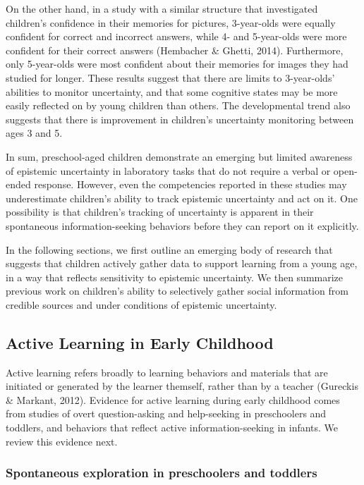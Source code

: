 \documentclass[a4paper,man,apacite,floatsintext]{apa6}
\begin{document}
On the other hand, in a study with a similar structure that investigated
children's confidence in their memories for pictures, 3-year-olds were
equally confident for correct and incorrect answers, while 4- and
5-year-olds were more confident for their correct answers (Hembacher \&
Ghetti, 2014). Furthermore, only 5-year-olds were most confident about
their memories for images they had studied for longer. These results
suggest that there are limits to 3-year-olds' abilities to monitor
uncertainty, and that some cognitive states may be more easily reflected
on by young children than others. The developmental trend also suggests
that there is improvement in children's uncertainty monitoring between
ages 3 and 5.

In sum, preschool-aged children demonstrate an emerging but limited
awareness of epistemic uncertainty in laboratory tasks that do not
require a verbal or open-ended response. However, even the competencies
reported in these studies may underestimate children's ability to track
epistemic uncertainty and act on it. One possibility is that children's
tracking of uncertainty is apparent in their spontaneous
information-seeking behaviors before they can report on it explicitly.

In the following sections, we first outline an emerging body of research
that suggests that children actively gather data to support learning
from a young age, in a way that reflects sensitivity to epistemic
uncertainty. We then summarize previous work on children's ability to
selectively gather social information from credible sources and under
conditions of epistemic uncertainty.

\subsection{Active Learning in Early
Childhood}\label{active-learning-in-early-childhood}

Active learning refers broadly to learning behaviors and materials that
are initiated or generated by the learner themself, rather than by a
teacher (Gureckis \& Markant, 2012). Evidence for active learning during
early childhood comes from studies of overt question-asking and
help-seeking in preschoolers and toddlers, and behaviors that reflect
active information-seeking in infants. We review this evidence next.

\subsubsection{Spontaneous exploration in preschoolers and
toddlers}\label{spontaneous-exploration-in-preschoolers-and-toddlers}
\end{document}
